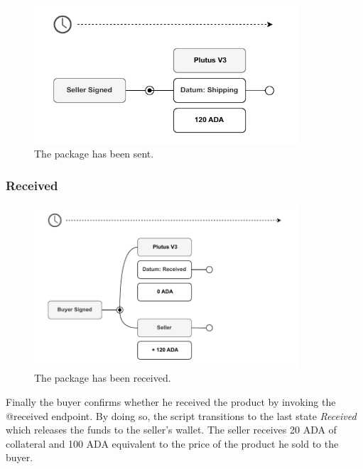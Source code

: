 \documentclass[12pt]{article}
\begin{document}
\begin{figure}[ht]
  \centering
  \includegraphics[width=0.88\textwidth, keepaspectratio]{3.pdf}
  \caption{The package has been sent.}  
  \label{fig:delivered}
\end{figure}

\subsubsection { Received }

\begin{figure}[ht]
  \centering
  \includegraphics[width=0.88\textwidth, keepaspectratio]{4.pdf}
  \caption{The package has been received.}
  \label{fig:delivered}
\end{figure}

Finally the buyer confirms whether he received the product by invoking the @received endpoint. By doing so, the script transitions to the last state \emph{Received} which releases the funds to the seller's wallet. The seller receives 20 ADA of collateral and 100 ADA equivalent to the price of the product he sold to the buyer.
\\
\\
\\
\\
\\
\\
\\
\\
\\
\end{document}
